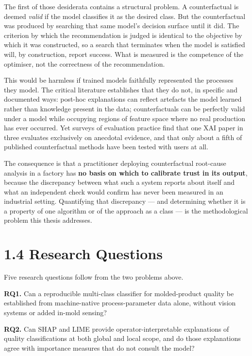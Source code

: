 The first of those desiderata contains a structural problem. A counterfactual is deemed \emph{valid} if the model classifies it as the desired class. But the counterfactual was produced by searching that same model's decision surface until it did. The criterion by which the recommendation is judged is identical to the objective by which it was constructed, so a search that terminates when the model is satisfied will, by construction, report success. What is measured is the competence of the optimiser, not the correctness of the recommendation.

This would be harmless if trained models faithfully represented the processes they model. The critical literature establishes that they do not, in specific and documented ways: post-hoc explanations can reflect artefacts the model learned rather than knowledge present in the data; counterfactuals can be perfectly valid under a model while occupying regions of feature space where no real production has ever occurred. Yet surveys of evaluation practice find that one XAI paper in three evaluates exclusively on anecdotal evidence, and that only about a fifth of published counterfactual methods have been tested with users at all.

The consequence is that a practitioner deploying counterfactual root-cause analysis in a factory has \textbf{no basis on which to calibrate trust in its output}, because the discrepancy between what such a system reports about itself and what an independent check would confirm has never been measured in an industrial setting. Quantifying that discrepancy --- and determining whether it is a property of one algorithm or of the approach as a class --- is the methodological problem this thesis addresses.

\hypertarget{research-questions}{%
\section{1.4 Research Questions}\label{research-questions}}

Five research questions follow from the two problems above.

\textbf{RQ1.} Can a reproducible multi-class classifier for molded-product quality be established from machine-native process-parameter data alone, without vision systems or added in-mold sensing?

\textbf{RQ2.} Can SHAP and LIME provide operator-interpretable explanations of quality classifications at both global and local scope, and do those explanations agree with importance measures that do not consult the model?


